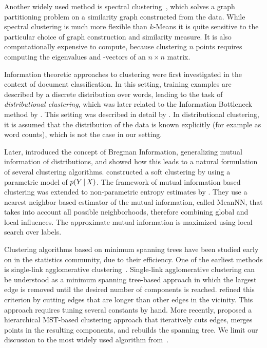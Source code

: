 Another widely used method is spectral clustering~\citep{shi2000normalized,ng2002spectral}, 
which solves a graph partitioning problem on a similarity
graph constructed from the data. While spectral clustering is much more
flexible than $k$-Means it is quite sensitive to the particular choice of graph
construction and similarity measure. It is also computationally expensive to
compute, because clustering $n$ points requires computing the eigenvalues and
-vectors of an $n\times n$ matrix.

Information theoretic approaches to clustering were first investigated in the
context of document classification. In this setting, training examples are
described by a discrete distribution over words, leading to the task of
\emph{distributional clustering}, which was later related to the Information
Bottleneck method by \citep{slonim1999agglomerative}.
This setting was described in detail by \citep{dhillon2003divisive}. In
distributional clustering, it is assumed that the distribution of the data is
known explicitly (for example as word counts), which is not the case in our
setting.

Later, \citet{banerjee2005clustering} introduced the concept of Bregman
Information, generalizing mutual information of distributions, and showed how
this leads to a natural formulation of several clustering algorithms.
%
\citet{barber2006kernelized} constructed a soft clustering by using a parametric model of $p(Y\, | \, X)$.
%
The framework of mutual information based clustering was extended to
non-parametric entropy estimates by \citet{faivishevsky2010nonparametric}.
They use a nearest neighbor based estimator of the mutual information, called
MeanNN, that takes into account all possible neighborhoods, therefore combining
global and local influences. The approximate mutual information is maximized
using local search over labels.

Clustering algorithms based on minimum spanning trees have been studied early
on in the statistics community, due to their efficiency.  One of the earliest
methods is single-link agglomerative clustering~\citep{gower1969minimum}.
Single-link agglomerative clustering can be understood as a minimum spanning
tree-based approach in which the largest edge is removed until the desired
number of components is reached.  \citet{zahn1971graph} refined this criterion
by cutting edges that are longer than other edges in the vicinity. This
approach requires tuning several constants by hand. More recently,
\citet{grygorash2006minimum} proposed a hierarchical MST-based clustering
approach that iteratively cuts edges, merges points in the resulting
components, and rebuilds the spanning tree.
We limit our discussion to the most widely used algorithm from~\citep{gower1969minimum}.
%
